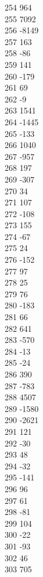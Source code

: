 { 254	964 \\
 255	7092 \\
 256	-8149 \\
 257	163 \\
 258	-86 \\
 259	141 \\
 260	-179 \\
 261	69 \\
 262	-9 \\
 263	1541 \\
 264	-1445 \\
 265	-133 \\
 266	1040 \\
 267	-957 \\
 268	197 \\
 269	-307 \\
 270	34 \\
 271	107 \\
 272	-108 \\
 273	155 \\
 274	-67 \\
 275	24 \\
 276	-152 \\
 277	97 \\
 278	25 \\
 279	76 \\
 280	-183 \\
 281	66 \\
 282	641 \\
 283	-570 \\
 284	-13 \\
 285	-24 \\
 286	390 \\
 287	-783 \\
 288	4507 \\
 289	-1580 \\
 290	-2621 \\
 291	121 \\
 292	-30 \\
 293	48 \\
 294	-32 \\
 295	-141 \\
 296	96 \\
 297	61 \\
 298	-81 \\
 299	104 \\
 300	-22 \\
 301	-93 \\
 302	46 \\
 303	705 \\
}
